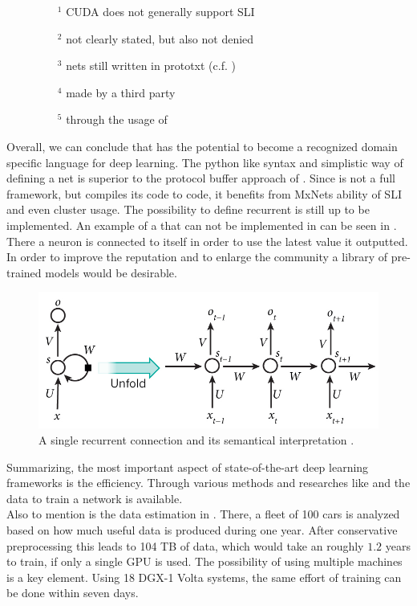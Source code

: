 \vspace{-1em}
\begin{figure}[H]
	\footnotesize
	\begin{multicols}{2}
	\begin{itemize}
		\item[$^1$] CUDA does not generally support SLI
		\item[$^2$] not clearly stated, but also not denied
		\item[$^3$] nets still written in prototxt (c.f. )
		\item[$^4$] made by a third party\cite{CaffeOnSpark}
		\item[$^5$] through the usage of \mxnet
	\end{itemize}
	\end{multicols}
\end{figure}

Overall, we can conclude that \cnnarch has the potential to become a recognized domain specific language for deep learning. The python like syntax and simplistic way of defining a net is superior to the protocol buffer approach of \caffe. Since \cnnarch is not a full framework, but compiles its code to \mxnet code, it benefits from MxNets ability of SLI and even cluster usage. The possibility to define recurrent \nns is still up to be implemented. An example of a \nn that can not be implemented in \cnnarch can be seen in . There a neuron is connected to itself in order to use the latest value it outputted. In order to improve the reputation \cnnarch and to enlarge the community a library of pre-trained models would be desirable.

\begin{figure}
	\centering
	\includegraphics[scale=0.3]{src/pic/rnn.jpg}
	\caption{A single recurrent connection and its semantical interpretation \cite{britz2015recurrent}.}
	\label{pic: Simple RNN}
\end{figure}

Summarizing, the most important aspect of state-of-the-art deep learning frameworks is the efficiency. Through various methods and researches like \kitti and \torcs the data to train a network is available.\\
Also to mention is the data estimation in \cite{grzywaczewski2017training}. There, a fleet of 100 cars is analyzed based on how much useful data is produced during one year. After conservative preprocessing this leads to 104 TB of data, which would take an \alexnet roughly $1.2$ years to train, if only a single GPU is used. The possibility of using multiple machines is a key element. Using 18 DGX-1 Volta systems, the same effort of training can be done within seven days.
